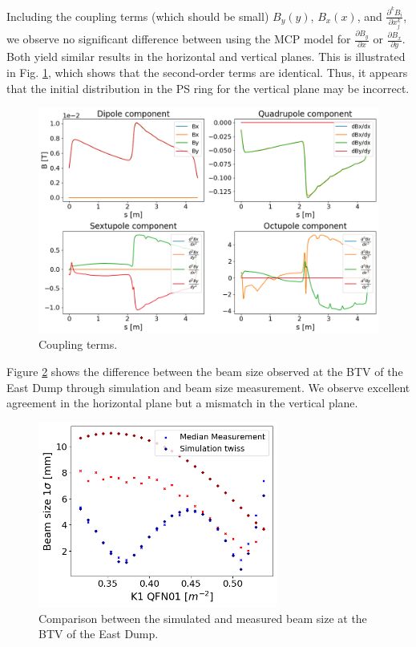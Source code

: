 Including the coupling terms (which should be small) $B_{y}(y)$, $B_{x}(x)$, and $\frac{\partial^{k} B_{i}}{\partial x_{j}^{k}}$, we observe no significant difference between using the MCP model for $\frac{\partial B_{y}}{\partial x}$ or $\frac{\partial B_{x}}{\partial y}$. Both yield similar results in the horizontal and vertical planes. This is illustrated in Fig. \ref{fig:coupling_terms}, which shows that the second-order terms are identical. Thus, it appears that the initial distribution in the PS ring for the vertical plane may be incorrect.

\begin{figure}[H]
\centering
\includegraphics[width=1.0\textwidth]{02_Simulation/images/coupling_terms.png}
\caption{Coupling terms.}
\label{fig:coupling_terms}
\end{figure}

Figure \ref{fig:comparison_sim_meas} shows the difference between the beam size observed at the BTV of the East Dump through simulation and beam size measurement. We observe excellent agreement in the horizontal plane but a mismatch in the vertical plane.

\begin{figure}[H]
\centering
\includegraphics[width=0.7\textwidth]{02_Simulation/images/comparison_sim_meas.png}
\caption{Comparison between the simulated and measured beam size at the BTV of the East Dump.}
\label{fig:comparison_sim_meas}
\end{figure}





